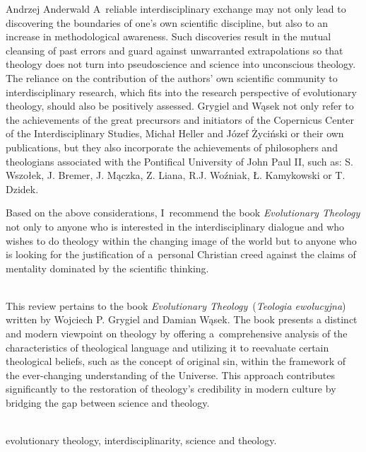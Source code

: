 \begin{newrevengenv}{Andrzej Anderwald}
A~reliable interdisciplinary exchange may not only lead to discovering the boundaries of one's own scientific discipline, but also to an increase in methodological awareness. Such discoveries result in the mutual cleansing of past errors and guard against unwarranted extrapolations so that theology does not turn into pseudoscience and science into unconscious theology. The reliance on the contribution of the authors' own scientific community to interdisciplinary research, which fits into the research perspective of evolutionary theology, should also be positively assessed. Grygiel and Wąsek not only refer to the achievements of the great precursors and initiators of the Copernicus Center of the Interdisciplinary Studies, Michał Heller and Józef Życiński or their own publications, but they also incorporate the achievements of philosophers and theologians associated with the Pontifical University of John Paul II, such as: S. Wszołek, J. Bremer, J. Mączka, Z. Liana, R.J. Woźniak, Ł. Kamykowski or T. Dzidek.



Based on the above considerations, I~recommend the book \textit{Evolutionary Theology} not only to anyone who is interested in the interdisciplinary dialogue and who wishes to do theology within the changing image of the world but to anyone who is looking for the justification of a~personal Christian creed against the claims of mentality dominated by the scientific thinking.



\vspace{15mm}%
{}\\
{This review pertains to the book \textit{Evolutionary Theology} (\textit{Teologia ewolucyjna}) written by Wojciech P. Grygiel and Damian Wąsek. The book presents a distinct and modern viewpoint on theology by offering a~comprehensive analysis of the characteristics of theological language and utilizing it to reevaluate certain theological beliefs, such as the concept of original sin, within the framework of the ever-changing understanding of the Universe. This approach contributes significantly to the restoration of theology's credibility in modern culture by bridging the gap between science and theology.}\par%
\vspace{2mm}%
{}\\
{evolutionary theology, interdisciplinarity, science and theology.}%

\enlargethispage{1.5\baselineskip}

\end{newrevengenv}

